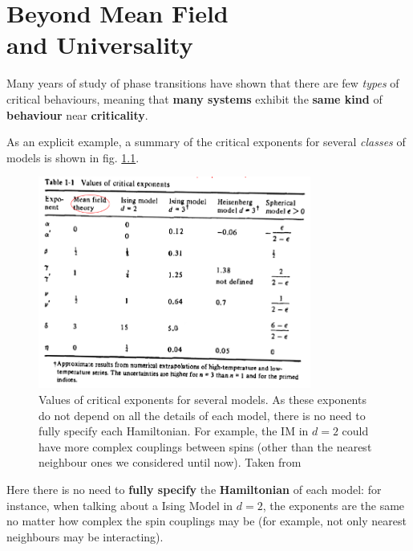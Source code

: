 \documentclass[../../main.tex]{subfiles}
\begin{document}

\chapter{Beyond Mean Field\\ and Universality}
Many years of study of phase transitions have shown that there are few \textit{types} of critical behaviours, meaning that \textbf{many systems} exhibit the \textbf{same kind} of \textbf{behaviour} near \textbf{criticality}.

\medskip

As an explicit example, a summary of the critical exponents for several \textit{classes} of models is shown in fig. \ref{fig:table-criticality}. 

\begin{figure}[H]
    \centering
    \includegraphics[width=0.8\textwidth]{table-criticality.png}
    \caption{Values of critical exponents for several models. As these exponents do not depend on all the details of each model, there is no need to fully specify each Hamiltonian. For example, the IM in $d=2$ could have more complex couplings between spins (other than the nearest neighbour ones we considered until now). Taken from \cite{renormalization}}
    \label{fig:table-criticality}
\end{figure}

Here there is no need to \textbf{fully specify} the \textbf{Hamiltonian} of each model: for instance, when talking about a Ising Model in $d=2$, the exponents are the same no matter how complex the spin couplings may be (for example, not only nearest neighbours may be interacting).
\end{document}
